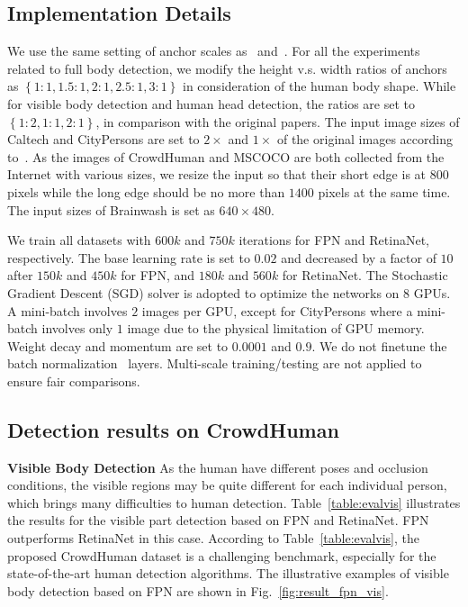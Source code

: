 \documentclass[10pt,twocolumn,letterpaper]{article}
\newcommand{\myparagraph}[1]{{\vspace{0.5em} \noindent \bf #1}}
\begin{document}
\subsection{Implementation Details}
We use the same setting of anchor scales as~\cite{lin2017feature} and~\cite{lin2017focal}. For all the experiments related to full body detection, we modify the height v.s. width ratios of anchors as $\left\{ 1:1, 1.5:1, 2:1, 2.5:1, 3:1 \right\}$ in consideration of  the human body shape. While for visible body detection and human head detection, the ratios are set to $\left\{ 1:2, 1:1, 2:1 \right\}$, in comparison with the original papers. The input image sizes of Caltech and CityPersons are set to $2\times$ and $1\times$ of the original images according to~\cite{zhang2017citypersons}. As the images of CrowdHuman and MSCOCO are both collected from the Internet with various sizes, we resize the input so that their short edge is at $800$ pixels while the long edge should be no more than $1400$ pixels at the same time. The input sizes of Brainwash is set as $640\times480$.

We train all datasets with $600k$ and $750k$ iterations for FPN and RetinaNet, respectively. The base learning rate is set to $0.02$ and decreased by a factor of $10$ after $150k$ and $450k$ for FPN, and $180k$ and $560k$ for RetinaNet. The Stochastic Gradient Descent (SGD) solver is adopted to optimize the networks on $8$ GPUs. A mini-batch involves $2$ images per GPU, except for CityPersons where a mini-batch involves only $1$ image due to the physical limitation of GPU memory. Weight decay and momentum are set to $0.0001$ and $0.9$. We do not finetune the batch normalization~\cite{ioffe2015batch} layers. Multi-scale training/testing are not applied to ensure fair comparisons. 


\subsection{Detection results on CrowdHuman}
\label{sec:expCrowdhuman}

\myparagraph{Visible Body Detection} As the human have different poses and occlusion conditions, the visible regions may be quite different for each individual person, which brings many difficulties to human detection. Table~\ref{table:evalvis} illustrates the results for the visible part detection based on FPN and RetinaNet. FPN outperforms RetinaNet in this case. According to Table~\ref{table:evalvis}, the proposed CrowdHuman dataset is a challenging benchmark, especially for the state-of-the-art human detection algorithms. The illustrative examples of visible body detection based on FPN are shown in Fig.~\ref{fig:result_fpn_vis}.
\end{document}
